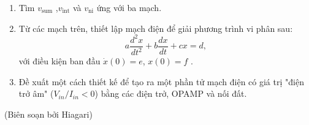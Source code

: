 \begin{enumerate}[resume]
    \item Tìm $v_\text{sum}$ ,$v_\text{int}$ và $v_\text{ni}$ ứng với ba mạch.
    \item Từ các mạch trên, thiết lập mạch điện để giải phương trình vi phân sau:
    \begin{equation}
        a\dfrac{d^2x}{dt^2}+b\dfrac{dx}{dt}+cx=d ,
    \end{equation}
với điều kiện ban đầu $\dot{x}(0)=e$, $x(0)=f$ .
    \item Đề xuất một cách thiết kế để tạo ra một phần tử mạch điện có giá trị "điện trở âm" ($V_{in}/I_{in} < 0$) bằng các điện trở, OPAMP và nối đất.  
\end{enumerate}

\begin{flushright}
    (Biên soạn bởi Hiagari)
\end{flushright}

